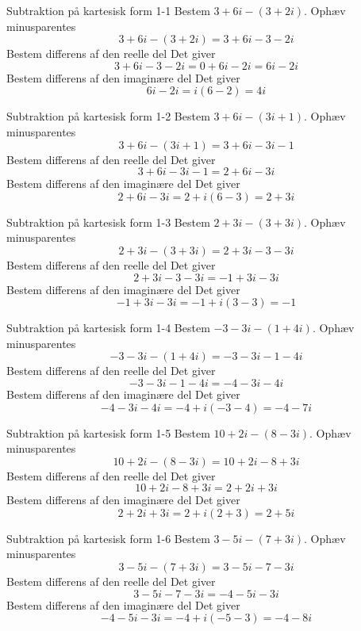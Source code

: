 \documentclass{article}
\begin{document}
\tableofcontents
\newpage
\begin{exercise}{Subtraktion på kartesisk form 1-1}
Bestem $3 + 6i - (3 + 2i)$.
\hint
Ophæv minusparentes
\[3 + 6i - (3 + 2i) = 3 + 6i - 3 - 2i
\]
\hint
Bestem differens af den reelle del
\hint
Det giver
\[3 + 6i - 3 - 2i = 0 + 6i - 2i = 6i - 2i
\]
\hint
Bestem differens af den imaginære del
\hint
Det giver
\[6i - 2i = i(6 - 2) = 4i
\]
\end{exercise}
\newpage
\begin{exercise}{Subtraktion på kartesisk form 1-2}
Bestem $3 + 6i - (3i + 1)$.
\hint
Ophæv minusparentes
\[3 + 6i - (3i + 1) = 3 + 6i - 3i - 1
\]
\hint
Bestem differens af den reelle del
\hint
Det giver
\[3 + 6i - 3i - 1 = 2 + 6i - 3i
\]
\hint
Bestem differens af den imaginære del
\hint
Det giver
\[2 + 6i - 3i = 2 + i(6 - 3) = 2 + 3i
\]
\end{exercise}
\newpage
\begin{exercise}{Subtraktion på kartesisk form 1-3}
Bestem $2 + 3i - (3 + 3i)$.
\hint
Ophæv minusparentes
\[2 + 3i - (3 + 3i) = 2 + 3i - 3 - 3i
\]
\hint
Bestem differens af den reelle del
\hint
Det giver
\[2 + 3i - 3 - 3i = - 1 + 3i - 3i
\]
\hint
Bestem differens af den imaginære del
\hint
Det giver
\[ - 1 + 3i - 3i = - 1 + i(3 - 3) = - 1
\]
\end{exercise}
\newpage
\begin{exercise}{Subtraktion på kartesisk form 1-4}
Bestem $ - 3 - 3i - (1 + 4i)$.
\hint
Ophæv minusparentes
\[ - 3 - 3i - (1 + 4i) = - 3 - 3i - 1 - 4i
\]
\hint
Bestem differens af den reelle del
\hint
Det giver
\[ - 3 - 3i - 1 - 4i = - 4 - 3i - 4i
\]
\hint
Bestem differens af den imaginære del
\hint
Det giver
\[ - 4 - 3i - 4i = - 4 + i(-3 - 4) = - 4 - 7i
\]
\end{exercise}
\newpage
\begin{exercise}{Subtraktion på kartesisk form 1-5}
Bestem $10 + 2i - (8 - 3i)$.
\hint
Ophæv minusparentes
\[10 + 2i - (8 - 3i) = 10 + 2i - 8 + 3i
\]
\hint
Bestem differens af den reelle del
\hint
Det giver
\[10 + 2i - 8 + 3i = 2 + 2i + 3i
\]
\hint
Bestem differens af den imaginære del
\hint
Det giver
\[2 + 2i + 3i = 2 + i(2 + 3) = 2 + 5i
\]
\end{exercise}
\newpage
\begin{exercise}{Subtraktion på kartesisk form 1-6}
Bestem $3 - 5i - (7 + 3i)$.
\hint
Ophæv minusparentes
\[3 - 5i - (7 + 3i) = 3 - 5i - 7 - 3i
\]
\hint
Bestem differens af den reelle del
\hint
Det giver
\[3 - 5i - 7 - 3i = - 4 - 5i - 3i
\]
\hint
Bestem differens af den imaginære del
\hint
Det giver
\[ - 4 - 5i - 3i = - 4 + i(-5 - 3) = - 4 - 8i
 \]
\end{exercise}
\end{document}
